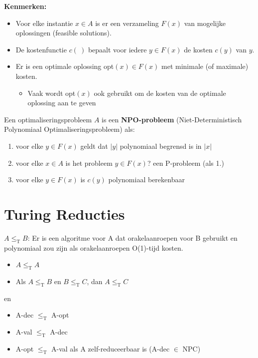 \documentclass[]{article}
\begin{document}
\textbf{Kenmerken:}

\begin{itemize}
\item Voor elke instantie $x \in A$ is er een verzameling $F(x)$ van mogelijke oplossingen (feasible solutions).
\item De kostenfunctie $c(~)$ bepaalt voor iedere $y \in F(x)$ de kosten $c(y)$ van $y$.
\item Er is een optimale oplossing opt$(x) \in F(x)$ met minimale (of maximale) kosten.
\begin{itemize}
\item Vaak wordt opt$(x)$ ook gebruikt om de kosten van de optimale oplossing aan te geven
\end{itemize}
\end{itemize}

Een optimaliseringsprobleem $A$ is een \textbf{NPO-probleem} (Niet-Deterministisch Polynomiaal Optimaliseringsprobleem) als:

\begin{enumerate}
\item voor elke $y \in F(x)$ geldt dat $|y|$ polynomiaal begrensd is in $|x|$
\item voor elke $x \in A$ is het probleem $y \in F(x)$? een P-probleem (als 1.)
\item voor elke $y \in F(x)$ is $c(y)$ polynomiaal berekenbaar
\end{enumerate}

\section*{Turing Reducties}

$A \leq_\text{T} B$: Er is een algoritme voor A dat orakelaanroepen voor B gebruikt en polynomiaal zou zijn als orakelaanroepen O(1)-tijd kosten.

\begin{itemize}
\item $A \leq_\text{T} A$
\item Als $A \leq_\text{T} B$ en $B \leq_\text{T} C$, dan $A \leq_\text{T} C$
\end{itemize}

en

\begin{itemize}
\item A-dec $\leq_\text{T}$ A-opt
\item A-val $\leq_\text{T}$ A-dec
\item A-opt $\leq_\text{T}$ A-val als A zelf-reduceerbaar is (A-dec $\in$ NPC)
\end{itemize}
\end{document}
